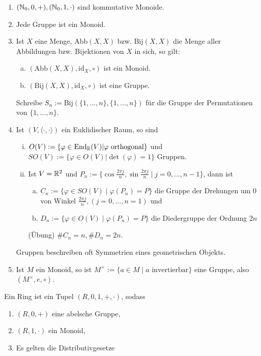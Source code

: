 \documentclass[a4paper]{report}
\begin{document}
\begin{bsp*}
  \begin{enumerate}[1)]
\item $(\Bbb N_{0}, 0, +), (\Bbb N_{0}, 1, \cdot)$ sind kommutative Monoide.
\item Jede Gruppe ist ein Monoid.
\item Ist $X$ eine Menge, $\mathrm{Abb}(X,X)$ bzw. $\mathrm{Bij}(X,X)$ die Menge aller Abbildungen bzw. Bijektionen von $X$ in sich, so gilt:
\begin{enumerate}[(a)]
    \item $(\mathrm{Abb}(X,X), \mathrm{id}_{X}, \circ)$ ist ein Monoid.
    \item $(\mathrm{Bij}(X,X), \mathrm{id}_{X}, \circ)$ ist eine Gruppe.
\end{enumerate}
    Schreibe $S_{n}:=\mathrm{Bij}(\{1, ..., n\}, \{1, ..., n\})$ für die Gruppe der Permutationen von $\{1, ..., n\}$.
    \item Ist $(V, \langle \cdot, \cdot \rangle)$ ein Euklidischer Raum, so sind
    \begin{enumerate}[(i)]
    \item $O(V):= \{\varphi \in \mathrm{End}_{\Bbb R}(V) | \varphi \text{ orthogonal}\}$ und $SO(V):= \{\varphi \in O(V) | \det(\varphi) = 1\}$ Gruppen.
    \item Ist $V = \Bbb R^{2}$ und $P_{n}:=\{\cos \frac{2\pi j}{n}, \sin \frac{2\pi j}{n} \mid j = 0, ..., n-1\}$, dann ist
    \begin{enumerate}[(a)]
        \item $C_{n}:= \{\varphi \in SO(V) \mid \varphi(P_{n}) = P\}$ die Gruppe der Drehungen um 0 von Winkel $\frac{2\pi j}{n}, (j=0, ..., n=1)$ und
        \item $D_{n}:= \{\varphi \in O(V) \mid \varphi(P_{n})=P\}$ die Diedergruppe der Ordnung $2n$

    \end{enumerate}
        (Übung) $\#C_{n} = n, \#D_{n} = 2n$.
    \end{enumerate}
    Gruppen beschreiben oft Symmetrien eines geometrischen Objekts.
\item Ist $M$ ein Monoid, so ist $M^\times:=\{a \in M \mid a \text{ invertierbar}\}$ eine Gruppe, also $(M^{\times}, e, \circ)$.

  \end{enumerate}
\end{bsp*}

\begin{defi}
  Ein Ring ist ein Tupel $(R, 0, 1, +, \cdot)$, sodass
  \begin{enumerate}[(R1)]
    \item $(R, 0, +)$ eine abelsche Gruppe,
    \item $(R, 1, \cdot)$ ein Monoid,
    \item Es gelten die Distributivgesetze
  \end{enumerate}
\end{defi}
\end{document}
